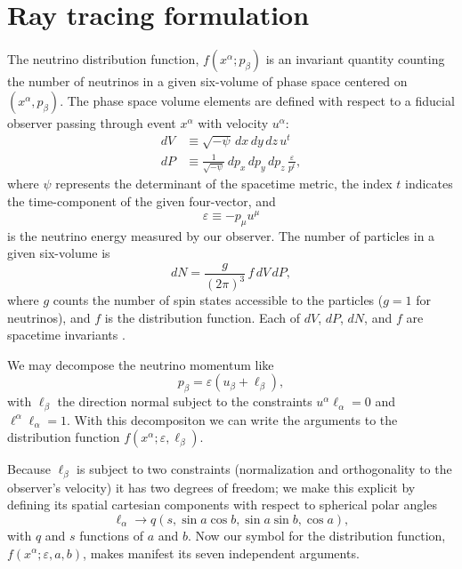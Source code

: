 \documentclass[aps,floatfix,prd,superscriptaddress,twocolumn]{revtex4-1}
\begin{document}
\section{Ray tracing formulation}
\label{sec:formulation}
The neutrino distribution function, $f(x^\alpha; p_\beta)$ is an invariant
quantity counting the number of neutrinos in a given six-volume of phase
space centered on $(x^\alpha,p_\beta)$.
The phase space volume elements are defined with respect to a fiducial
observer passing through event $x^\alpha$ with velocity $u^\alpha$:
\begin{align}
  \label{eqn:dV}
  dV & \equiv \sqrt{-\psi} \, dx \, dy \, dz \, u^t \\
  \label{eqn:dP}
  dP & \equiv \frac{1}{\sqrt{-\psi}} \, dp_x \, dp_y \, dp_z \,
  \frac{\varepsilon}{p^t},
\end{align}
where $\psi$ represents the determinant of the spacetime metric,
the index $t$ indicates the time-component of the given four-vector, and
\begin{equation}
  \label{eqn:varepsilon}
  \varepsilon \equiv -p_\mu u^\mu
\end{equation}
is the neutrino energy measured by our observer.
The number of particles in a given six-volume is
\begin{equation}
  dN=\frac{g}{(2\pi)^3}\,f\,dV\,dP,
\end{equation}
where $g$ counts the number of spin states accessible to the
particles ($g=1$ for neutrinos), and $f$ is the distribution function.
Each of $dV$, $dP$, $dN$, and $f$ are spacetime invariants
\citep{debb2009-gr_boltzmann_1, debb2009-gr_boltzmann_2, lind1966-gr_boltzmann}.

We may decompose the neutrino momentum like
\begin{equation}
  \label{eqn:def_momentum}
  p_\beta = \varepsilon (u_\beta + \ell_\beta),
\end{equation}
with $\ell_\beta$ the direction normal subject to the constraints
$u^\alpha \ell_\alpha = 0$ and $\ell^\alpha \ell_\alpha=1$.
With this decompositon we can write the arguments to the distribution function
$f(x^\alpha;\varepsilon,\ell_\beta)$.

Because $\ell_\beta$ is subject to two constraints
(normalization and orthogonality to the observer's velocity)
it has two degrees of freedom; we make this explicit by defining its
spatial cartesian components with respect to spherical polar angles
\begin{equation}
  \label{eqn:def_direction}
  \ell_\alpha \rightarrow
  q (s,\sin a \cos b,\sin a\sin b,\cos a),
\end{equation}
with $q$ and $s$ functions of $a$ and $b$.
Now our symbol for the distribution function,
$f(x^\alpha;\varepsilon,a,b)$,
makes manifest its seven independent arguments.
\end{document}

